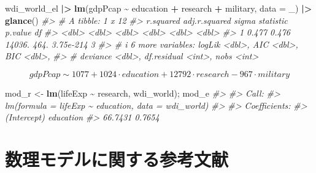 \documentclass[
  xelatex, ja=standard]{bxjsbook}
\newenvironment{Shaded}{\begin{snugshade}}{\end{snugshade}}
\newcommand{\AttributeTok}[1]{\textcolor[rgb]{0.13,0.29,0.53}{#1}}
\newcommand{\CommentTok}[1]{\textcolor[rgb]{0.56,0.35,0.01}{\textit{#1}}}
\newcommand{\FunctionTok}[1]{\textcolor[rgb]{0.13,0.29,0.53}{\textbf{#1}}}
\newcommand{\NormalTok}[1]{#1}
\newcommand{\OtherTok}[1]{\textcolor[rgb]{0.56,0.35,0.01}{#1}}
\newcommand{\SpecialCharTok}[1]{\textcolor[rgb]{0.81,0.36,0.00}{\textbf{#1}}}
\theoremstyle{definition}
\theoremstyle{definition}
\theoremstyle{definition}
\theoremstyle{definition}
\theoremstyle{remark}
\begin{document}
\begin{Shaded}
\begin{Highlighting}[]
\NormalTok{wdi\_world\_el }\SpecialCharTok{|\textgreater{}} \FunctionTok{lm}\NormalTok{(gdpPcap }\SpecialCharTok{\textasciitilde{}}\NormalTok{ education }\SpecialCharTok{+}\NormalTok{ research }\SpecialCharTok{+}\NormalTok{ military, }\AttributeTok{data =}\NormalTok{ \_) }\SpecialCharTok{|\textgreater{}} \FunctionTok{glance}\NormalTok{()}
\CommentTok{\#\textgreater{} \# A tibble: 1 x 12}
\CommentTok{\#\textgreater{}   r.squared adj.r.squared  sigma statistic   p.value    df}
\CommentTok{\#\textgreater{}       \textless{}dbl\textgreater{}         \textless{}dbl\textgreater{}  \textless{}dbl\textgreater{}     \textless{}dbl\textgreater{}     \textless{}dbl\textgreater{} \textless{}dbl\textgreater{}}
\CommentTok{\#\textgreater{} 1     0.477         0.476 14036.      464. 3.75e{-}214     3}
\CommentTok{\#\textgreater{} \# i 6 more variables: logLik \textless{}dbl\textgreater{}, AIC \textless{}dbl\textgreater{}, BIC \textless{}dbl\textgreater{},}
\CommentTok{\#\textgreater{} \#   deviance \textless{}dbl\textgreater{}, df.residual \textless{}int\textgreater{}, nobs \textless{}int\textgreater{}}
\end{Highlighting}
\end{Shaded}

\[gdpPcap \sim 1077 + 1024\cdot education + 12792 \cdot research - 967 \cdot military\]

\begin{Shaded}
\begin{Highlighting}[]
\NormalTok{mod\_r }\OtherTok{\textless{}{-}} \FunctionTok{lm}\NormalTok{(lifeExp }\SpecialCharTok{\textasciitilde{}}\NormalTok{ research, wdi\_world); mod\_e}
\CommentTok{\#\textgreater{} }
\CommentTok{\#\textgreater{} Call:}
\CommentTok{\#\textgreater{} lm(formula = lifeExp \textasciitilde{} education, data = wdi\_world)}
\CommentTok{\#\textgreater{} }
\CommentTok{\#\textgreater{} Coefficients:}
\CommentTok{\#\textgreater{} (Intercept)    education  }
\CommentTok{\#\textgreater{}     66.7431       0.7654}
\end{Highlighting}
\end{Shaded}

\hypertarget{ux6570ux7406ux30e2ux30c7ux30ebux306bux95a2ux3059ux308bux53c2ux8003ux6587ux732e}{%
\section{数理モデルに関する参考文献}\label{ux6570ux7406ux30e2ux30c7ux30ebux306bux95a2ux3059ux308bux53c2ux8003ux6587ux732e}}
\end{document}
